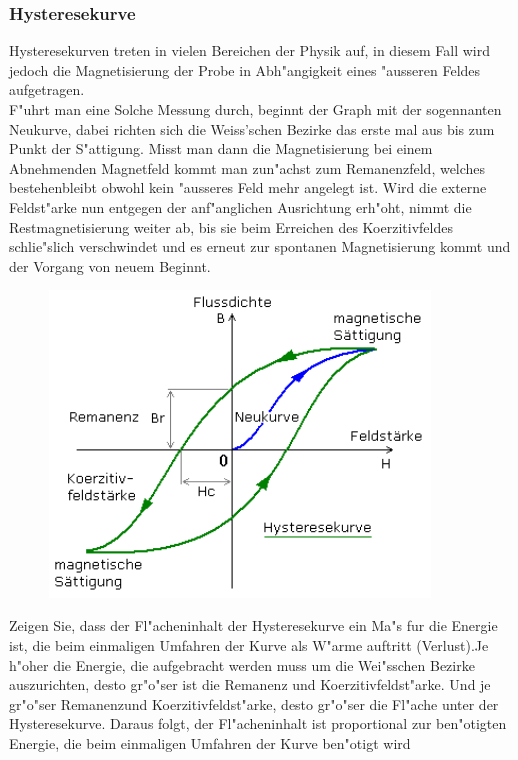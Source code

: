         \subsubsection*{Hysteresekurve}
            Hysteresekurven treten in vielen Bereichen der Physik auf, in diesem Fall wird jedoch die Magnetisierung
            der Probe in Abh"angigkeit eines "ausseren Feldes aufgetragen.\\
            F"uhrt man eine Solche Messung durch, beginnt der Graph mit der sogennanten Neukurve, dabei richten sich
            die Weiss'schen Bezirke das erste mal aus bis zum Punkt der S"attigung. Misst man dann die Magnetisierung bei einem Abnehmenden Magnetfeld
            kommt man zun"achst zum Remanenzfeld, welches bestehenbleibt obwohl kein "ausseres Feld mehr angelegt ist. Wird die externe Feldst"arke nun entgegen der anf"anglichen Ausrichtung erh"oht, nimmt die Restmagnetisierung weiter ab, bis
            sie beim Erreichen des Koerzitivfeldes schlie"slich verschwindet und es erneut zur spontanen Magnetisierung kommt und der Vorgang von neuem Beginnt.
            \begin{figure}[H]
                \centering
                \includegraphics[width=0.9\textwidth]{Images/hyster.png}
            \end{figure}

            Zeigen Sie, dass der Fl"acheninhalt der Hysteresekurve ein Ma"s fur die Energie ist, die beim einmaligen Umfahren der Kurve als W"arme
            auftritt (Verlust).Je h"oher die Energie, die aufgebracht werden muss um die Wei"sschen Bezirke auszurichten, desto gr"o"ser ist die
            Remanenz und Koerzitivfeldst"arke. Und je gr"o"ser Remanenzund Koerzitivfeldst"arke, desto gr"o"ser die Fl"ache unter der Hysteresekurve.
            Daraus folgt, der Fl"acheninhalt ist proportional zur ben"otigten Energie, die beim einmaligen Umfahren der Kurve ben"otigt wird

